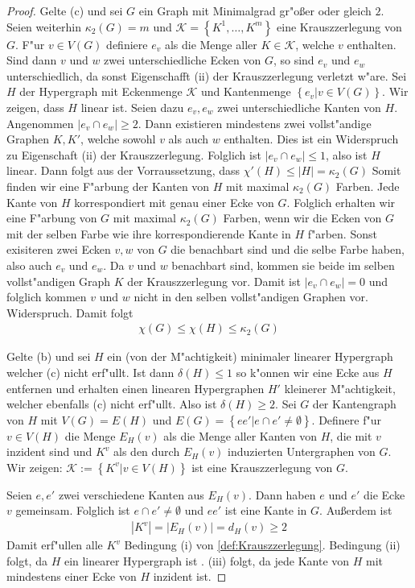 \begin{proof}
  Gelte (c) und sei $G$ ein Graph mit Minimalgrad gr"o{\ss}er oder gleich $2$. Seien weiterhin $\kappa_{2}(G) = m $ und $\mathcal{K}= \left\{ K^{1},\dots,K^{m} \right\}$ eine Krauszzerlegung von $G$. 
  F"ur $v\in V(G)$ definiere $e_v$ als die Menge aller $K\in \mathcal{K}$, welche $v$ enthalten. Sind dann $v$ und $w$ zwei unterschiedliche Ecken von $G$, so sind $e_v$ und $e_{w}$ unterschiedlich, da sonst Eigenschafft (ii) der Krauszzerlegung verletzt w"are. 
  Sei $H$ der Hypergraph mit Eckenmenge $\mathcal{K}$ und Kantenmenge $\left\{ e_v| v\in V(G) \right\}$. 
  Wir zeigen, dass $H$ linear ist. 
  Seien dazu $e_{v},e_{w} $ zwei unterschiedliche Kanten von $H$.
  Angenommen $|e_{v}\cap e_{w}| \geq 2$. Dann existieren mindestens zwei vollst"andige Graphen $K,K'$, welche sowohl $v$ als auch $w$ enthalten. Dies ist ein Widerspruch zu Eigenschaft (ii) der Krauszzerlegung. Folglich ist $|e_{v}\cap e_{w}| \leq 1$, also ist $H$ linear. Dann folgt aus der Vorraussetzung, dass $\chi'(H) \leq |H| = \kappa_{2}(G)$ 
  Somit finden wir eine F"arbung der Kanten von $H$ mit maximal $\kappa_{2}(G)$ Farben. Jede Kante von $H$ korrespondiert mit genau einer Ecke von $G$. Folglich erhalten wir eine F"arbung von $G$ mit maximal $\kappa_{2}(G)$ Farben, wenn wir die Ecken von $G$ mit der selben Farbe wie ihre korrespondierende Kante in $H$ f"arben.  Sonst exisiteren zwei Ecken $v,w$ von $G$ die benachbart sind und die selbe Farbe haben, 
  also auch $e_v$ und $e_w$. Da $v$ und $w$ benachbart sind, kommen sie beide im selben vollst"andigen Graph $K$ der Krauszzerlegung vor. Damit ist $|e_v\cap e_w| = 0$ und folglich kommen $v$ und $w$ nicht in den selben vollst"andigen Graphen vor. Widerspruch. Damit folgt
  \begin{align*}
    \chi(G) \leq \chi(H) \leq \kappa_{2}(G)
  \end{align*}

  Gelte (b) und sei $H$ ein (von der M"achtigkeit) minimaler linearer Hypergraph welcher (c) nicht erf"ullt. Ist dann $\delta(H) \leq 1$ so k"onnen wir eine Ecke aus $H$ entfernen und erhalten einen linearen Hypergraphen $H'$ kleinerer M"achtigkeit, welcher ebenfalls (c) nicht erf"ullt. Also ist $\delta(H) \geq 2$. Sei $G$ der Kantengraph von $H$ mit $V(G) = E(H)$ und $E(G) = \left\{ ee'|e\cap e' \neq \emptyset \right\}$. Definere f"ur $v\in V(H)$ die Menge $E_{H}(v)$ als die Menge aller
  Kanten von $H$, die mit $v$ inzident sind und $K^{v}$ als den durch $E_H(v)$ induzierten Untergraphen von $G$.
  Wir zeigen: $\mathcal K := \left\{ K^{v}| v \in V(H) \right\}$ ist eine Krauszzerlegung von $G$.  

  Seien $e,e'$ zwei verschiedene Kanten aus $E_{H}(v)$. Dann haben $e$ und $e'$ die Ecke $v$ gemeinsam. Folglich ist $e\cap e' \neq \emptyset$ und $ee'$ ist eine Kante in $G$. Au{\ss}erdem ist 
  \begin{align*}
    |K^{v}| = |E_H(v)| = d_{H}(v) \geq 2
  \end{align*}
  Damit erf"ullen alle $K^{v}$ Bedingung (i) von \ref{def:Krauszzerlegung}. Bedingung (ii) folgt, da $H$ ein linearer Hypergraph ist . (iii) folgt, da jede Kante von $H$ mit mindestens einer Ecke von $H$ inzident ist.
\end{proof}
